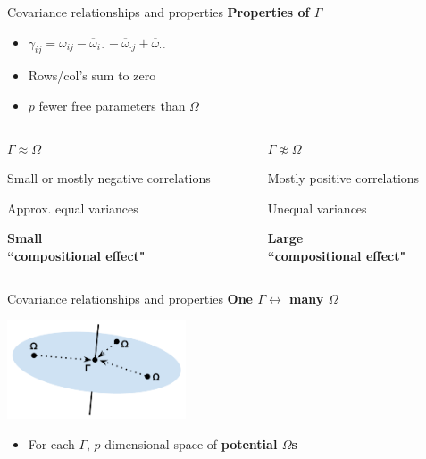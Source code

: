 \documentclass[professionalfonts]{beamer}
\begin{document}
\begin{frame}{Covariance relationships and properties}
\textbf{Properties of $\Gamma$}
\begin{itemize}
\item $\gamma_{ij} = \omega_{ij} - \overline{\omega}_{i \cdot} - \overline{\omega}_{\cdot j} + \overline{\omega}_{\cdot \cdot}$
\item Rows/col's sum to zero
\item $p$ fewer free parameters than $\Omega$
\end{itemize}
\vspace{1em}
\pause
\begin{columns}
\begin{column}{0.45\textwidth}
$\Gamma \approx \Omega$
\begin{itemize}\begin{small}
\item Small or mostly negative correlations
\item Approx. equal variances
\item \textbf{Small \\ ``compositional effect"}
\end{small}\end{itemize}
\end{column}
\begin{column}{0.45\textwidth}
$\Gamma \not\approx \Omega$
\begin{itemize}\begin{small}
\item Mostly positive correlations
\item Unequal variances
\item \textbf{Large \\ ``compositional effect"}
\end{small}\end{itemize}
\end{column}
\end{columns}
\end{frame}

\begin{frame}{Covariance relationships and properties}
\textbf{One $\Gamma \leftrightarrow$ many $\Omega$}
\begin{center}
\includegraphics[width=200px]{figs/matrix-space.pdf}
\end{center}
\begin{itemize}
\item For each $\Gamma$, $p$-dimensional space of \textbf{potential $\Omega$s}
\end{itemize}
\end{frame}
\end{document}
